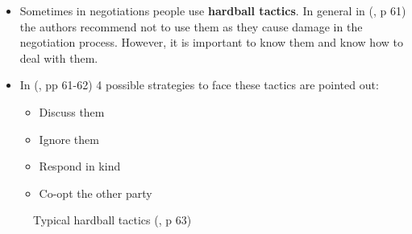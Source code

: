 \documentclass[
  ignorenonframetext,
]{beamer}
\providecommand{\tightlist}{%
  \setlength{\itemsep}{0pt}\setlength{\parskip}{0pt}}\usepackage{longtable,booktabs,array}
\begin{document}
\begin{frame}{}
\label{section-16}
\begin{itemize}
\item
  Sometimes in negotiations people use \textbf{hardball tactics}. In
  general in (, p 61) the authors recommend not to use
  them as they cause damage in the negotiation process. However, it is
  important to know them and know how to deal with them.
\item
  In (, pp 61-62) 4 possible strategies to face these
  tactics are pointed out:

  \begin{itemize}
  \tightlist
  \item
    Discuss them
  \item
    Ignore them
  \item
    Respond in kind
  \item
    Co-opt the other party
  \end{itemize}
\end{itemize}
\end{frame}

\begin{frame}{}
\label{section-17}
\begin{figure}


\caption{\label{fig-hard-ball-tactics}Typical hardball tactics
(, p 63)}

\end{figure}%
\end{frame}
\end{document}
